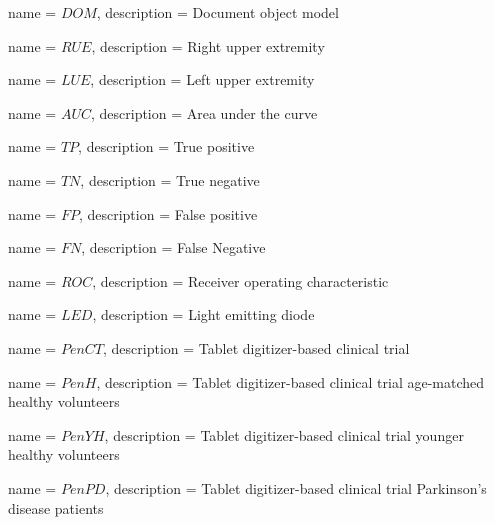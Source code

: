 {
	name = $DOM$, 
	description = Document object model
}

{
	name = $RUE$, 
	description = Right upper extremity
}

{
	name = $LUE$, 
	description = Left upper extremity
}

{
	name = $AUC$, 
	description = Area under the curve
}

{
	name = $TP$, 
	description = True positive
}

{
	name = $TN$, 
	description = True negative
}

{
	name = $FP$, 
	description = False positive
}

{
	name = $FN$, 
	description = False Negative
}

{
	name = $ROC$, 
	description = Receiver operating characteristic
}

{
	name = $LED$, 
	description = Light emitting diode
}

{
	name = $PenCT$, 
	description = Tablet digitizer-based clinical trial
}

{
	name = $PenH$, 
	description = Tablet digitizer-based clinical trial age-matched healthy volunteers
}

{
	name = $PenYH$, 
	description = Tablet digitizer-based clinical trial younger healthy volunteers
}

{
	name = $PenPD$, 
	description = Tablet digitizer-based clinical trial Parkinson's disease patients 
}
\makenoidxglossaries